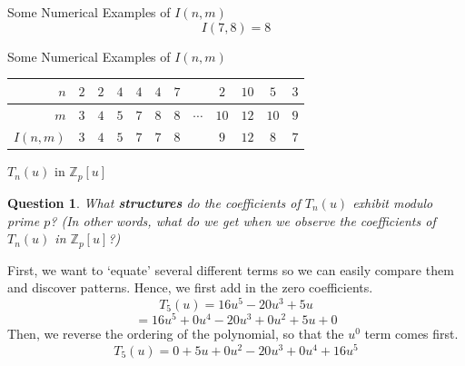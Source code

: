 \documentclass{beamer}
\newtheorem{question}{Question}
\begin{document}
\begin{frame}{Some Numerical Examples of $I(n,m)$}
 \vspace{-12pt}
 \[I(7,8)=8\]
\end{frame}

\begin{frame}{Some Numerical Examples of $I(n,m)$}
 \begin{table}[]
  \begin{tabular}{r|c|c|c|c|c|ccc|c|c|c}
   $n$      & $2$ & $2$ & $4$ & $4$ & $4$ & $7$ &          & $2$  & $10$ & $5$  & $3$ \\ \hline
   $m$      & $3$ & $4$ & $5$ & $7$ & $8$ & $8$ & $\cdots$ & $10$ & $12$ & $10$ & $9$ \\ \hline
   $I(n,m)$ & $3$ & $4$ & $5$ & $7$ & $7$ & $8$ &          & $9$  & $12$ & $8$  & $7$ \\
  \end{tabular}
 \end{table}
\end{frame}

\begin{frame}{$T_n(u)$ in $\mathbb{Z}_p[u]$}
 \vspace{-6pt}
 \begin{question}
  What \textbf{structures} do the coefficients of $T_n(u)$ exhibit modulo prime $p$? (In other words, what do we get when we observe the coefficients of $T_n(u)$ in $\mathbb{Z}_p[u]$?)
 \end{question}
 \vspace{12pt} \pause
 First, we want to `equate' several different terms so we can easily compare them and discover patterns. Hence, we first add in the zero coefficients. \pause
 \[T_5(u) = 16u^5 - 20u^3 + 5u\] \pause
 \[=16u^5 + 0u^4- 20u^3 +0u^2 + 5u + 0\] \pause
 Then, we reverse the ordering of the polynomial, so that the $u^0$ term comes first. \pause
 \[T_5(u)=0+5u +0u^2 - 20u^3  + 0u^4+ 16u^5\]
\end{frame}
\end{document}
